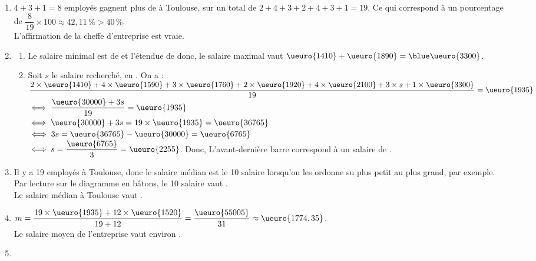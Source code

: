 \ \\ [-5mm]
   \begin{enumerate}
      \item $4+3+1 =8$ employés gagnent plus de  à Toulouse, sur un total de $2+4+3+2+4+3+1 =19$. Ce qui correspond à un pourcentage de $\dfrac{8}{19}\times100 \approx42,11\,\%>40\,\%$. \\ [1mm]
         {\blue L'affirmation de la cheffe d'entreprise est vraie}.
      \item
         \begin{enumerate}
            \item Le salaire minimal est de  et l'étendue de  donc, {\blue le salaire maximal vaut} $\ueuro{1410}+\ueuro{1890} ={\blue \ueuro{3300}}$. \\
            \item Soit $s$ le salaire recherché, en \ueuro{}. On a : \\ [2mm]
               $\dfrac{2\times\ueuro{1410}+4\times\ueuro{1590}+3\times\ueuro{1760}+2\times\ueuro{1920}+4\times\ueuro{2100}+3\times s+1\times\ueuro{3300}}{19} =\ueuro{1935}$ \\ [1mm]
               $\iff \dfrac{\ueuro{30000}+3s}{19} =\ueuro{1935}$ \\ [2mm]
               $\iff \ueuro{30000}+3s =19\times\ueuro{1935} =\ueuro{36765}$ \\ [1mm]
               $\iff 3s =\ueuro{36765}-\ueuro{30000} =\ueuro{6765}$ \\ [2mm]
               $\iff s =\dfrac{\ueuro{6765}}{3} =\ueuro{2255}$. Donc, {\blue L'avant-dernière barre correspond à un salaire de }. \medskip
         \end{enumerate}
      \setcounter{enumi}{2}
      \item Il y a 19 employés à Toulouse, donc le salaire médian est le 10 salaire lorsqu'on les ordonne su plus petit au plus grand, par exemple. Par lecture sur le diagramme en bâtons, le 10 salaire vaut . \\
         {\blue Le salaire médian à Toulouse vaut }. \medskip
      \item $m =\dfrac{19\times\ueuro{1935}+12\times\ueuro{1520}}{19+12} =\dfrac{\ueuro{55005}}{31} \approx\ueuro{1774,35}$. \\ [2mm]
         {\blue Le salaire moyen de l'entreprise vaut environ }.
      \item
         \begin{enumerate}

\end{enumerate}
\end{enumerate}
